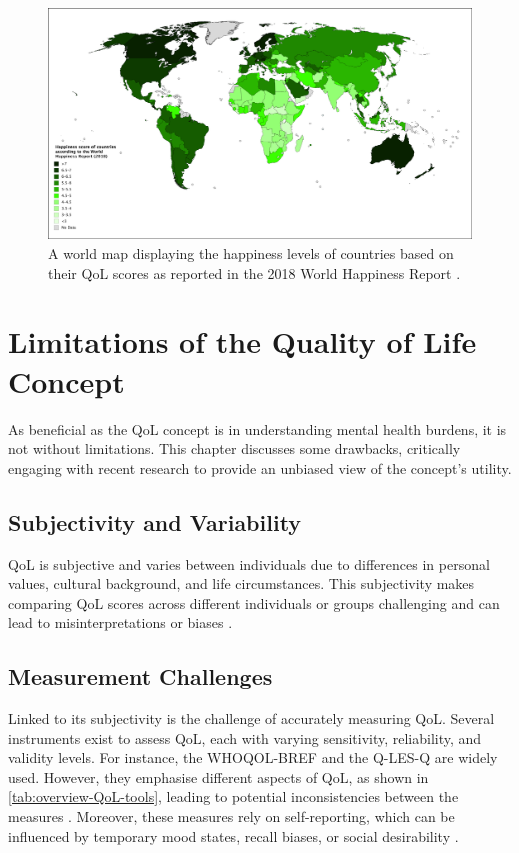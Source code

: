 \documentclass[10pt]{article}
\begin{document}
\begin{sloppypar}
  \begin{figure}[ht]
    \centering
    \includegraphics[width=\textwidth]{figures/qol-world.png}
    \caption[A world map displaying the happiness levels of countries based on their QoL scores as reported in the 2018 World Happiness Report.]{A world map displaying the happiness levels of countries based on their QoL scores as reported in the 2018 World Happiness Report \citep{helliwell_world_2018}.}
    \label{fig:qol-map}
  \end{figure}

  \section{Limitations of the Quality of Life Concept}
  \label{sec:limitations}

  As beneficial as the QoL concept is in understanding mental health burdens, it is not without limitations. This chapter discusses some drawbacks, critically engaging with recent research to provide an unbiased view of the concept’s utility.

  \subsection{Subjectivity and Variability}
  \label{subsec:subjectivity}
  QoL is subjective and varies between individuals due to differences in personal values, cultural background, and life circumstances. This subjectivity makes comparing QoL scores across different individuals or groups challenging and can lead to misinterpretations or biases \citep{skevington_expecting_2012}.

  \subsection{Measurement Challenges}
  \label{subsec:measurement}
  Linked to its subjectivity is the challenge of accurately measuring QoL. Several instruments exist to assess QoL, each with varying sensitivity, reliability, and validity levels. For instance, the WHOQOL-BREF and the Q-LES-Q are widely used. However, they emphasise different aspects of QoL, as shown in \autoref{tab:overview-QoL-tools}, leading to potential inconsistencies between the measures \citep{endicott_quality_1993,harper_development_1998}. Moreover, these measures rely on self-reporting, which can be influenced by temporary mood states, recall biases, or social desirability \citep{bowling_just_2005}.


\end{sloppypar}
\end{document}
